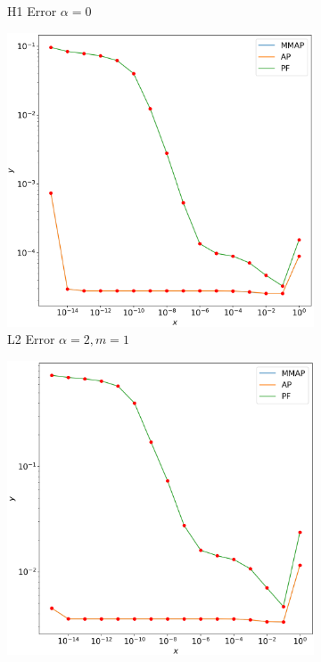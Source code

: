 \documentclass[12pt]{ociamthesis}
\begin{document}
\begin{figure}[H]
\begin{subfigure}{0.44\textwidth}
     \caption{H1 Error $\alpha=0$}
 \end{subfigure}
 \begin{subfigure}{0.44\textwidth}
     \includegraphics[width=\textwidth]{Pics/LHSims/E1b_MMAP_AP_PFL2.png}
     \caption{L2 Error $\alpha=2, m=1$}
 \end{subfigure}
 \begin{subfigure}{0.44\textwidth}
     \includegraphics[width=\textwidth]{Pics/LHSims/E1b_MMAP_AP_PFH1.png}

\end{subfigure}
\end{figure}
\end{document}
